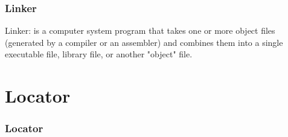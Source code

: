 \documentclass[]{beamer}
\begin{document}
\begin{frame}
  \frametitle{Linker}
  \begin{Definition}
    \alert{Linker}: is a computer system program that takes one or more object files
    (generated by a compiler or an assembler) and combines them into a single executable file,
    library file, or another "object" file. 
  \end{Definition}
  
\end{frame}

\section{Locator}

\begin{frame}
  \frametitle{Locator}

\end{frame}
\end{document}
